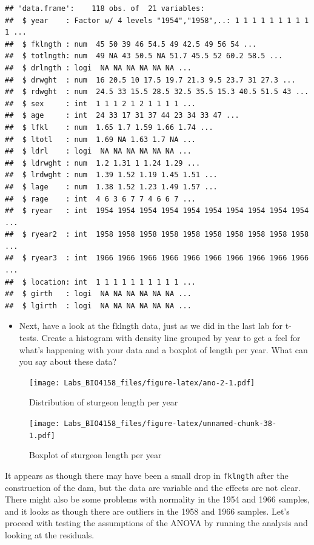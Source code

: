 \documentclass[
  12pt,
]{book}
\providecommand{\tightlist}{%
  \setlength{\itemsep}{0pt}\setlength{\parskip}{0pt}}
\begin{document}
\begin{verbatim}
## 'data.frame':    118 obs. of  21 variables:
##  $ year    : Factor w/ 4 levels "1954","1958",..: 1 1 1 1 1 1 1 1 1 1 ...
##  $ fklngth : num  45 50 39 46 54.5 49 42.5 49 56 54 ...
##  $ totlngth: num  49 NA 43 50.5 NA 51.7 45.5 52 60.2 58.5 ...
##  $ drlngth : logi  NA NA NA NA NA NA ...
##  $ drwght  : num  16 20.5 10 17.5 19.7 21.3 9.5 23.7 31 27.3 ...
##  $ rdwght  : num  24.5 33 15.5 28.5 32.5 35.5 15.3 40.5 51.5 43 ...
##  $ sex     : int  1 1 1 2 1 2 1 1 1 1 ...
##  $ age     : int  24 33 17 31 37 44 23 34 33 47 ...
##  $ lfkl    : num  1.65 1.7 1.59 1.66 1.74 ...
##  $ ltotl   : num  1.69 NA 1.63 1.7 NA ...
##  $ ldrl    : logi  NA NA NA NA NA NA ...
##  $ ldrwght : num  1.2 1.31 1 1.24 1.29 ...
##  $ lrdwght : num  1.39 1.52 1.19 1.45 1.51 ...
##  $ lage    : num  1.38 1.52 1.23 1.49 1.57 ...
##  $ rage    : int  4 6 3 6 7 7 4 6 6 7 ...
##  $ ryear   : int  1954 1954 1954 1954 1954 1954 1954 1954 1954 1954 ...
##  $ ryear2  : int  1958 1958 1958 1958 1958 1958 1958 1958 1958 1958 ...
##  $ ryear3  : int  1966 1966 1966 1966 1966 1966 1966 1966 1966 1966 ...
##  $ location: int  1 1 1 1 1 1 1 1 1 1 ...
##  $ girth   : logi  NA NA NA NA NA NA ...
##  $ lgirth  : logi  NA NA NA NA NA NA ...
\end{verbatim}

\begin{itemize}
\tightlist
\item
  Next, have a look at the fklngth data, just as we did in the last lab for t-tests. Create a histogram with density line grouped by year to get a feel for what's happening with your data and a boxplot of length per year. What can you say about these data?
\end{itemize}

\begin{figure}
\centering
\texttt{[image: Labs\_BIO4158\_files/figure-latex/ano-2-1.pdf]}
\caption{\label{fig:ano-2}Distribution of sturgeon length per year}
\end{figure}

\begin{figure}
\centering
\texttt{[image: Labs\_BIO4158\_files/figure-latex/unnamed-chunk-38-1.pdf]}
\caption{\label{fig:unnamed-chunk-38}Boxplot of sturgeon length per year}
\end{figure}

It appears as though there may have been a small drop in \texttt{fklngth} after the construction of the dam, but the data are variable and the effects are not clear. There might also be some problems with normality in the 1954 and 1966 samples, and it looks as though there are outliers in the 1958 and 1966 samples. Let's proceed with testing the assumptions of the ANOVA by running the analysis and looking at the residuals.
\end{document}
